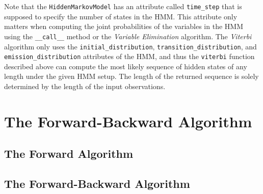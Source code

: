 \documentclass{article}
\theoremstyle{definition}
\begin{document}
Note that the \texttt{HiddenMarkovModel} has an attribute called \texttt{time\_step} that is supposed to specify the number of states in the HMM. This attribute only matters when computing the joint probabilities of the variables in the HMM using the \texttt{\_\_call\_\_} method or the \textit{Variable Elimination} algorithm. The \textit{Viterbi} algorithm only uses the \texttt{initial\_distribution}, \texttt{transition\_distribution}, and \texttt{emission\_distribution} attributes of the HMM, and thus the \texttt{viterbi} function described above can compute the most likely sequence of hidden states of any length under the given HMM setup. The length of the returned sequence is solely determined by the length of the input observations.

\pagebreak

\section{The Forward-Backward Algorithm}

\subsection{The Forward Algorithm} \label{sec:forward_algorithm}

\subsection{The Forward-Backward Algorithm} \label{sec:forward_backward_algorithm}
\end{document}
